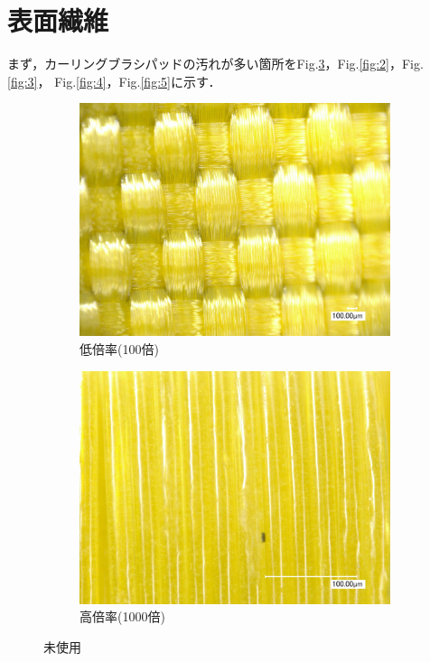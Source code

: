 \documentclass[main]{subfiles}
\begin{document}
\section{表面繊維}

まず，カーリングブラシパッドの汚れが多い箇所をFig.\ref{fig:1}，Fig.\ref{fig:2}，Fig.\ref{fig:3}，
Fig.\ref{fig:4}，Fig.\ref{fig:5}に示す．


\begin{figure}[H]
    \centering
    \begin{subfigure}[htbp]{0.45\linewidth}
        \centering
        \includegraphics[keepaspectratio, width=0.8\linewidth]{figures/縁/カーリングパッド未使用低倍率.jpg}
        \caption{低倍率(100倍)}
        \label{fig:label}
    \end{subfigure}
    \begin{subfigure}[htbp]{0.45\linewidth}
        \centering
        \includegraphics[keepaspectratio, width=0.8\linewidth]{figures/縁/カーリングパッド未使用.jpg}
        \caption{高倍率(1000倍)}
        \label{fig:label}
    \end{subfigure}
    \caption{未使用}
    \label{fig:1}
\end{figure}
\end{document}
